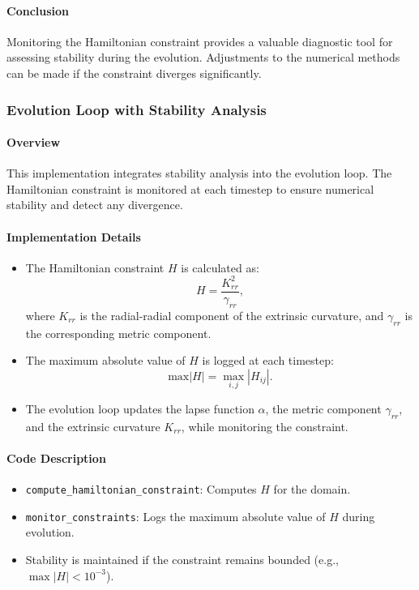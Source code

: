 \documentclass[12pt]{article}
\begin{document}
\paragraph{Conclusion}
Monitoring the Hamiltonian constraint provides a valuable diagnostic tool for assessing stability during the evolution. Adjustments to the numerical methods can be made if the constraint diverges significantly.

\subsubsection{Evolution Loop with Stability Analysis}

\paragraph{Overview}
This implementation integrates stability analysis into the evolution loop. The Hamiltonian constraint is monitored at each timestep to ensure numerical stability and detect any divergence.

\paragraph{Implementation Details}
\begin{itemize}
    \item The Hamiltonian constraint $H$ is calculated as:
    \[
    H = \frac{K_{rr}^2}{\gamma_{rr}},
    \]
    where $K_{rr}$ is the radial-radial component of the extrinsic curvature, and $\gamma_{rr}$ is the corresponding metric component.
    \item The maximum absolute value of $H$ is logged at each timestep:
    \[
    \text{max}|H| = \max_{i,j} \left| H_{ij} \right|.
    \]
    \item The evolution loop updates the lapse function $\alpha$, the metric component $\gamma_{rr}$, and the extrinsic curvature $K_{rr}$, while monitoring the constraint.
\end{itemize}

\paragraph{Code Description}
\begin{itemize}
    \item \texttt{compute\_hamiltonian\_constraint}: Computes $H$ for the domain.
    \item \texttt{monitor\_constraints}: Logs the maximum absolute value of $H$ during evolution.
    \item Stability is maintained if the constraint remains bounded (e.g., $\max |H| < 10^{-3}$).
\end{itemize}
\end{document}
